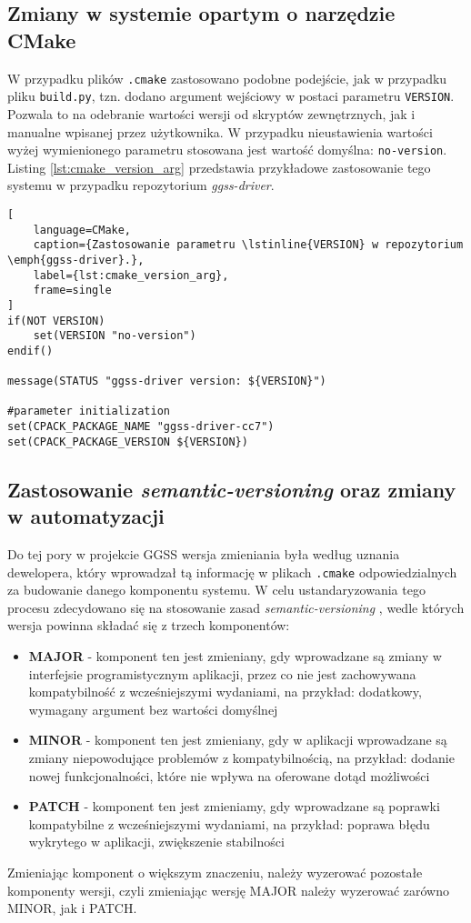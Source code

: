 \subsection{Zmiany w systemie opartym o narzędzie CMake}
W przypadku plików \lstinline{.cmake} zastosowano podobne podejście, jak w przypadku pliku \lstinline{build.py}, tzn. dodano argument wejściowy w postaci parametru \lstinline{VERSION}. Pozwala to na odebranie wartości wersji od skryptów zewnętrznych, jak i manualne wpisanej przez użytkownika. W przypadku nieustawienia wartości wyżej wymienionego parametru stosowana jest wartość domyślna: \lstinline{no-version}. Listing \ref{lst:cmake_version_arg} przedstawia przykładowe zastosowanie tego systemu w przypadku repozytorium \emph{ggss-driver}.

\begin{lstlisting}[
    language=CMake,
    caption={Zastosowanie parametru \lstinline{VERSION} w repozytorium \emph{ggss-driver}.},
    label={lst:cmake_version_arg},
    frame=single
]
if(NOT VERSION)
    set(VERSION "no-version")
endif()

message(STATUS "ggss-driver version: ${VERSION}")

#parameter initialization
set(CPACK_PACKAGE_NAME "ggss-driver-cc7")
set(CPACK_PACKAGE_VERSION ${VERSION})
\end{lstlisting}


\subsection{Zastosowanie \emph{semantic-versioning} oraz zmiany w automatyzacji}
Do tej pory w projekcie GGSS wersja zmieniania była według uznania dewelopera, który wprowadzał tą informację w plikach \lstinline{.cmake} odpowiedzialnych za budowanie danego komponentu systemu. W celu ustandaryzowania tego procesu zdecydowano się na stosowanie zasad \emph{semantic-versioning} \cite{semver}, wedle których wersja powinna składać się z trzech komponentów:
\begin{itemize}
    \item \textbf{MAJOR} - komponent ten jest zmieniany, gdy wprowadzane są zmiany w interfejsie programistycznym aplikacji, przez co nie jest zachowywana kompatybilność z wcześniejszymi wydaniami, na przykład: dodatkowy, wymagany argument bez wartości domyślnej
    \item \textbf{MINOR} - komponent ten jest zmieniany, gdy w aplikacji wprowadzane są zmiany niepowodujące problemów z kompatybilnością, na przykład: dodanie nowej funkcjonalności, które nie wpływa na oferowane dotąd możliwości
    \item \textbf{PATCH} - komponent ten jest zmieniamy, gdy wprowadzane są poprawki kompatybilne z wcześniejszymi wydaniami, na przykład: poprawa błędu wykrytego w aplikacji, zwiększenie stabilności
\end{itemize}
Zmieniając komponent o większym znaczeniu, należy wyzerować pozostałe komponenty wersji, czyli zmieniając wersję MAJOR należy wyzerować zarówno MINOR, jak i PATCH.


